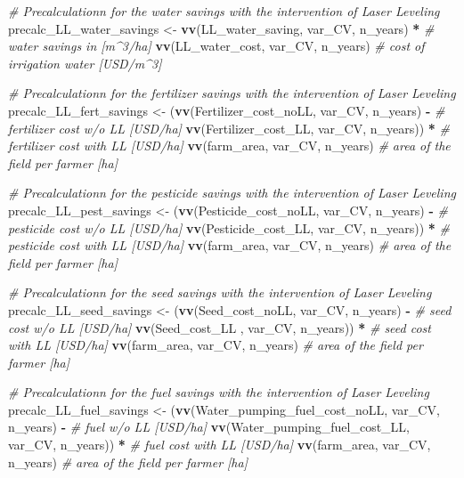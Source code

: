 \documentclass[
]{article}
\newenvironment{Shaded}{\begin{snugshade}}{\end{snugshade}}
\newcommand{\CommentTok}[1]{\textcolor[rgb]{0.56,0.35,0.01}{\textit{#1}}}
\newcommand{\FunctionTok}[1]{\textcolor[rgb]{0.13,0.29,0.53}{\textbf{#1}}}
\newcommand{\NormalTok}[1]{#1}
\newcommand{\OtherTok}[1]{\textcolor[rgb]{0.56,0.35,0.01}{#1}}
\newcommand{\SpecialCharTok}[1]{\textcolor[rgb]{0.81,0.36,0.00}{\textbf{#1}}}
\begin{document}
\begin{Shaded}
\begin{Highlighting}[]
  \CommentTok{\# Precalculationn for the water savings with the intervention of Laser Leveling}
\NormalTok{  precalc\_LL\_water\_savings }\OtherTok{\textless{}{-}}
    \FunctionTok{vv}\NormalTok{(LL\_water\_saving, var\_CV, n\_years) }\SpecialCharTok{*} \CommentTok{\# water savings in [m\^{}3/ha]}
    \FunctionTok{vv}\NormalTok{(LL\_water\_cost, var\_CV, n\_years) }\CommentTok{\# cost of irrigation water [USD/m\^{}3]}
  
  \CommentTok{\# Precalculationn for the fertilizer savings with the intervention of Laser Leveling}
\NormalTok{  precalc\_LL\_fert\_savings }\OtherTok{\textless{}{-}}
\NormalTok{    (}\FunctionTok{vv}\NormalTok{(Fertilizer\_cost\_noLL, var\_CV, n\_years) }\SpecialCharTok{{-}} \CommentTok{\# fertilizer cost w/o LL [USD/ha]}
    \FunctionTok{vv}\NormalTok{(Fertilizer\_cost\_LL, var\_CV, n\_years)) }\SpecialCharTok{*} \CommentTok{\# fertilizer cost with LL [USD/ha]}
    \FunctionTok{vv}\NormalTok{(farm\_area, var\_CV, n\_years) }\CommentTok{\# area of the field per farmer [ha]}
  
  \CommentTok{\# Precalculationn for the pesticide savings with the intervention of Laser Leveling}
\NormalTok{  precalc\_LL\_pest\_savings }\OtherTok{\textless{}{-}}
\NormalTok{    (}\FunctionTok{vv}\NormalTok{(Pesticide\_cost\_noLL, var\_CV, n\_years) }\SpecialCharTok{{-}} \CommentTok{\# pesticide cost w/o LL [USD/ha]}
    \FunctionTok{vv}\NormalTok{(Pesticide\_cost\_LL, var\_CV, n\_years)) }\SpecialCharTok{*} \CommentTok{\# pesticide cost with LL [USD/ha]}
    \FunctionTok{vv}\NormalTok{(farm\_area, var\_CV, n\_years) }\CommentTok{\# area of the field per farmer [ha]}
  
  \CommentTok{\# Precalculationn for the seed savings with the intervention of Laser Leveling}
\NormalTok{  precalc\_LL\_seed\_savings }\OtherTok{\textless{}{-}}
\NormalTok{    (}\FunctionTok{vv}\NormalTok{(Seed\_cost\_noLL, var\_CV, n\_years) }\SpecialCharTok{{-}} \CommentTok{\# seed cost w/o LL [USD/ha]}
    \FunctionTok{vv}\NormalTok{(Seed\_cost\_LL , var\_CV, n\_years)) }\SpecialCharTok{*} \CommentTok{\# seed cost with LL [USD/ha]}
    \FunctionTok{vv}\NormalTok{(farm\_area, var\_CV, n\_years) }\CommentTok{\# area of the field per farmer [ha]}
  
  \CommentTok{\# Precalculationn for the fuel savings with the intervention of Laser Leveling}
\NormalTok{  precalc\_LL\_fuel\_savings }\OtherTok{\textless{}{-}}
\NormalTok{    (}\FunctionTok{vv}\NormalTok{(Water\_pumping\_fuel\_cost\_noLL, var\_CV, n\_years) }\SpecialCharTok{{-}} \CommentTok{\# fuel w/o LL [USD/ha]}
    \FunctionTok{vv}\NormalTok{(Water\_pumping\_fuel\_cost\_LL, var\_CV, n\_years)) }\SpecialCharTok{*} \CommentTok{\# fuel cost with LL [USD/ha]}
    \FunctionTok{vv}\NormalTok{(farm\_area, var\_CV, n\_years) }\CommentTok{\# area of the field per farmer [ha]}
  

\end{Highlighting}
\end{Shaded}
\end{document}
